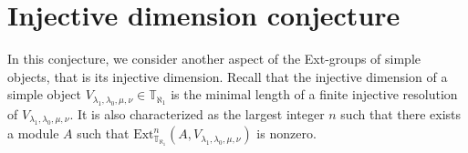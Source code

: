\documentclass[openany, a4paper]{amsbook}
\newtheorem{conj}[thm]{Conjecture}
\theoremstyle{definition}
\numberwithin{equation}{chapter}
\newcommand{\T}[1]{{\mathbb{T}}_{\aleph_{#1}}}
\newcommand{\Ext}[4]{\mathrm{Ext}^{#1}_{#2}({#3}, {#4})}
\begin{document}





\section{Injective dimension conjecture}
In this conjecture, we consider another aspect of the Ext-groups of simple objects, that is its injective dimension. Recall that the injective dimension of a simple object $V_{\lambda_1, \lambda_0, \mu, \nu} \in \T{1}$ is the minimal length of a finite injective resolution of $V_{\lambda_1, \lambda_0, \mu, \nu}$. It is also characterized as the largest integer $n$ such that there exists a module $A$ such that $\Ext{n}{\T{1}}{A}{V_{\lambda_1, \lambda_0, \mu, \nu}}$ is nonzero. 
\end{document}
